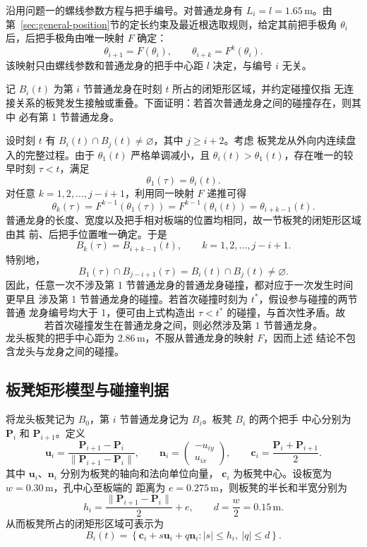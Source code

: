 \documentclass[
  11pt,
  UTF8]{ctexart}
\begin{document}
沿用问题一的螺线参数方程与把手编号。对普通龙身有 \(L_i=l=1.65\,\mathrm m\)。由
第~\ref{sec:general-position}节的定长约束及最近根选取规则，给定其前把手极角
\(\theta_i\) 后，后把手极角由唯一映射 \(F\) 确定：
\[
\theta_{i+1}=F(\theta_i),\qquad
\theta_{i+k}=F^k(\theta_i).
\]
该映射只由螺线参数和普通龙身的把手中心距 \(l\) 决定，与编号 \(i\) 无关。

记 \(B_i(t)\) 为第 \(i\) 节普通龙身在时刻 \(t\) 所占的闭矩形区域，并约定碰撞仅指
无连接关系的板凳发生接触或重叠。下面证明：若首次普通龙身之间的碰撞存在，则其中
必有第 1 节普通龙身。

设时刻 \(t\) 有 \(B_i(t)\cap B_j(t)\ne\varnothing\)，其中 \(j\geq i+2\)。考虑
板凳龙从外向内连续盘入的完整过程。由于 \(\theta_1(t)\) 严格单调减小，且
\(\theta_i(t)>\theta_1(t)\)，存在唯一的较早时刻 \(\tau<t\)，满足
\[
\theta_1(\tau)=\theta_i(t).
\]
对任意 \(k=1,2,\ldots,j-i+1\)，利用同一映射 \(F\) 递推可得
\[
\theta_k(\tau)
=F^{k-1}\!\left(\theta_1(\tau)\right)
=F^{k-1}\!\left(\theta_i(t)\right)
=\theta_{i+k-1}(t).
\]
普通龙身的长度、宽度以及把手相对板端的位置均相同，故一节板凳的闭矩形区域由其
前、后把手位置唯一确定。于是
\[
B_k(\tau)=B_{i+k-1}(t),
\qquad k=1,2,\ldots,j-i+1.
\]
特别地，
\[
B_1(\tau)\cap B_{j-i+1}(\tau)
=B_i(t)\cap B_j(t)\ne\varnothing.
\]
因此，任意一次不涉及第 1 节普通龙身的普通龙身碰撞，都对应于一次发生时间更早且
涉及第 1 节普通龙身的碰撞。若首次碰撞时刻为 \(t^*\)，假设参与碰撞的两节普通
龙身编号均大于 1，便可由上式构造出 \(\tau<t^*\) 的碰撞，与首次性矛盾。故
\[
\boxed{\text{若首次碰撞发生在普通龙身之间，则必然涉及第 1 节普通龙身。}}
\]
龙头板凳的把手中心距为 \(2.86\,\mathrm m\)，不服从普通龙身的映射 \(F\)，因而上述
结论不包含龙头与龙身之间的碰撞。

\subsection{板凳矩形模型与碰撞判据}

将龙头板凳记为 \(B_0\)，第 \(i\) 节普通龙身记为 \(B_i\)。板凳 \(B_i\) 的两个把手
中心分别为 \(\boldsymbol P_i\) 和 \(\boldsymbol P_{i+1}\)。定义
\[
\boldsymbol u_i=
\frac{\boldsymbol P_{i+1}-\boldsymbol P_i}
{\|\boldsymbol P_{i+1}-\boldsymbol P_i\|},
\qquad
\boldsymbol n_i=
\begin{pmatrix}-u_{iy}\\u_{ix}\end{pmatrix},
\qquad
\boldsymbol c_i=\frac{\boldsymbol P_i+\boldsymbol P_{i+1}}{2}.
\]
其中 \(\boldsymbol u_i\)、\(\boldsymbol n_i\) 分别为板凳的轴向和法向单位向量，
\(\boldsymbol c_i\) 为板凳中心。设板宽为 \(w=0.30\,\mathrm m\)，孔中心至板端的
距离为 \(e=0.275\,\mathrm m\)，则板凳的半长和半宽分别为
\[
h_i=\frac{\|\boldsymbol P_{i+1}-\boldsymbol P_i\|}{2}+e,
\qquad d=\frac{w}{2}=0.15\,\mathrm m.
\]
从而板凳所占的闭矩形区域可表示为
\[
B_i(t)=\left\{\boldsymbol c_i+s\boldsymbol u_i+q\boldsymbol n_i:
|s|\leq h_i,\ |q|\leq d\right\}.
\]
\end{document}
